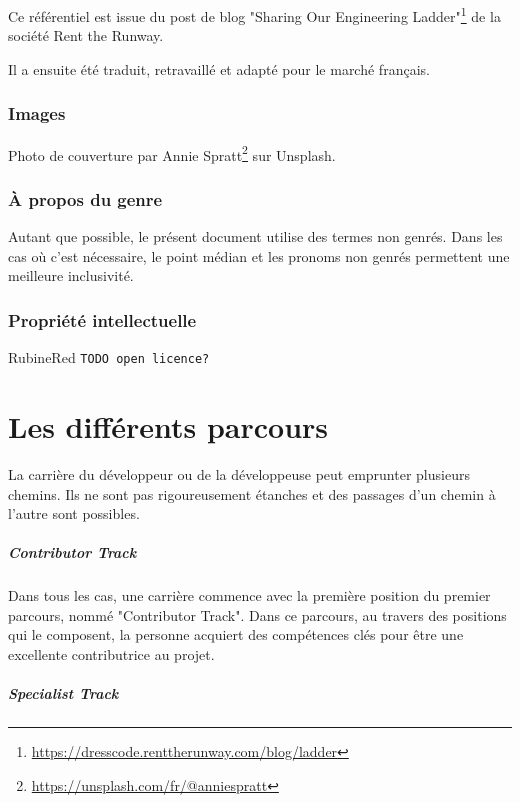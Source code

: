 \documentclass[a4paper, french, openany, 12pt]{book}
\newcommand{\fullwidthimage}[1]{
  \begin{center}
    \makebox[\textwidth]{\texttt{[image: \#1]}}
  \end{center}
}
\newcommand{\todo}[1]{
  \begin{color}{RubineRed}
    \texttt{TODO {#1}}
  \end{color}
}
\begin{document}
Ce référentiel est issue du post de blog 
"Sharing Our Engineering Ladder"\footnote{\url{https://dresscode.renttherunway.com/blog/ladder}}
de la société Rent the Runway.

Il a ensuite été traduit, retravaillé et adapté pour le marché français.

\section*{Images}

Photo de couverture par Annie Spratt\footnote{\url{https://unsplash.com/fr/@anniespratt}} sur Unsplash.

\section*{À propos du genre}

Autant que possible, le présent document utilise des termes non genrés.
Dans les cas où c'est nécessaire, le point médian et les pronoms non genrés permettent une meilleure inclusivité.

\section*{Propriété intellectuelle}

\todo{open licence?}

\mainmatter

\part{Les différents parcours}

\fullwidthimage{images/tracks.png}

La carrière du développeur ou de la développeuse peut emprunter plusieurs chemins.
Ils ne sont pas rigoureusement étanches et des passages d'un chemin à l'autre sont possibles.

\subsubsection*{Contributor Track}

Dans tous les cas, une carrière commence avec la première position du premier parcours, nommé "Contributor Track".
Dans ce parcours, au travers des positions qui le composent, la personne acquiert des compétences clés pour être une
excellente contributrice au projet.

\subsubsection*{Specialist Track}
\end{document}
